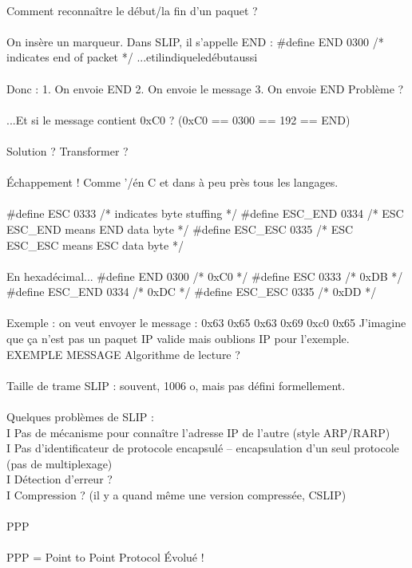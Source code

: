 \documentclass[5pt]{article}
\begin{document}
\begin{scriptsize}
\\
Comment reconnaître le début/la fin d’un paquet ?\\
\\
On insère un marqueur. Dans SLIP, il s’appelle END : \#define END 0300 /* indicates end of packet */ ...etilindiqueledébutaussi\\
\\
Donc : 1. On envoie END 2. On envoie le message 3. On envoie END Problème ?\\
\\
...Et si le message contient 0xC0 ? (0xC0 == 0300 == 192 == END)\\
\\
Solution ? Transformer ?\\
\\
Échappement ! Comme '/\' en C et dans à peu près tous les langages.\\
\\
\#define ESC 0333 /* indicates byte stuffing */ \#define ESC\_END 0334 /* ESC ESC\_END means END data byte */ \#define ESC\_ESC 0335 /* ESC ESC\_ESC means ESC data byte */\\
\\
En hexadécimal... \#define END 0300 /* 0xC0 */ \#define ESC 0333 /* 0xDB */ \#define ESC\_END 0334 /* 0xDC */ \#define ESC\_ESC 0335 /* 0xDD */ \\
\\
Exemple : on veut envoyer le message : 0x63 0x65 0x63 0x69 0xc0 0x65 J’imagine que ça n’est pas un paquet IP valide mais oublions IP pour l’exemple.
EXEMPLE MESSAGE
Algorithme de lecture ?\\
\\
Taille de trame SLIP : souvent, 1006 o, mais pas défini formellement.\\
\\
Quelques problèmes de SLIP :\\
I Pas de mécanisme pour connaître l’adresse IP de l’autre (style ARP/RARP)\\
I Pas d’identificateur de protocole encapsulé -- encapsulation d’un seul protocole (pas de multiplexage)\\
I Détection d’erreur ?\\
I Compression ? (il y a quand même une version compressée, CSLIP)\\
\\
PPP\\
\\
PPP = Point to Point Protocol Évolué !\\

\end{scriptsize}
\end{document}
